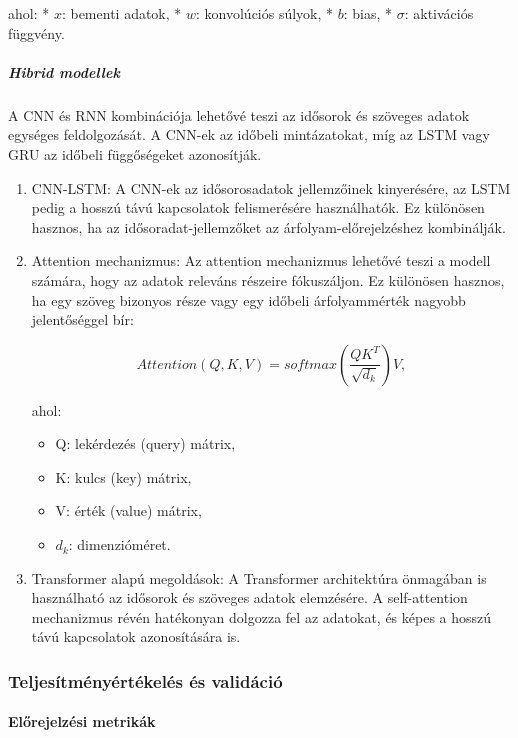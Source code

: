 \documentclass[11pt]{article}
\providecommand{\tightlist}{%
      \setlength{\itemsep}{0pt}\setlength{\parskip}{0pt}}
\begin{document}
ahol: * \(x\): bementi adatok, * \(w\): konvolúciós súlyok, * \(b\):
bias, * \(\sigma\): aktivációs függvény.

\subparagraph{Hibrid modellek}\label{hibrid-modellek}

A CNN és RNN kombinációja lehetővé teszi az idősorok és szöveges adatok
egységes feldolgozását. A CNN-ek az időbeli mintázatokat, míg az LSTM
vagy GRU az időbeli függőségeket azonosítják.

\begin{enumerate}
\def\labelenumi{\arabic{enumi}.}
\item
  CNN-LSTM: A CNN-ek az idősorosadatok jellemzőinek kinyerésére, az LSTM
  pedig a hosszú távú kapcsolatok felismerésére használhatók. Ez
  különösen hasznos, ha az idősoradat-jellemzőket az
  árfolyam-előrejelzéshez kombinálják.
\item
  Attention mechanizmus: Az attention mechanizmus lehetővé teszi a
  modell számára, hogy az adatok releváns részeire fókuszáljon. Ez
  különösen hasznos, ha egy szöveg bizonyos része vagy egy időbeli
  árfolyammérték nagyobb jelentőséggel bír:

  \[Attention(Q,K,V) = softmax\left(\frac{QK^T}{\sqrt{d_k}}\right)V,\]

  ahol:

  \begin{itemize}
  \tightlist
  \item
    Q: lekérdezés (query) mátrix,
  \item
    K: kulcs (key) mátrix,
  \item
    V: érték (value) mátrix,
  \item
    \(d_k\): dimenzióméret.
  \end{itemize}
\item
  Transformer alapú megoldások: A Transformer architektúra önmagában is
  használható az idősorok és szöveges adatok elemzésére. A
  self-attention mechanizmus révén hatékonyan dolgozza fel az adatokat,
  és képes a hosszú távú kapcsolatok azonosítására is.
\end{enumerate}

\subsubsection{Teljesítményértékelés és
validáció}\label{teljesuxedtmuxe9nyuxe9rtuxe9keluxe9s-uxe9s-validuxe1ciuxf3}

\paragraph{Előrejelzési metrikák}\label{elux151rejelzuxe9si-metrikuxe1k}
\end{document}
